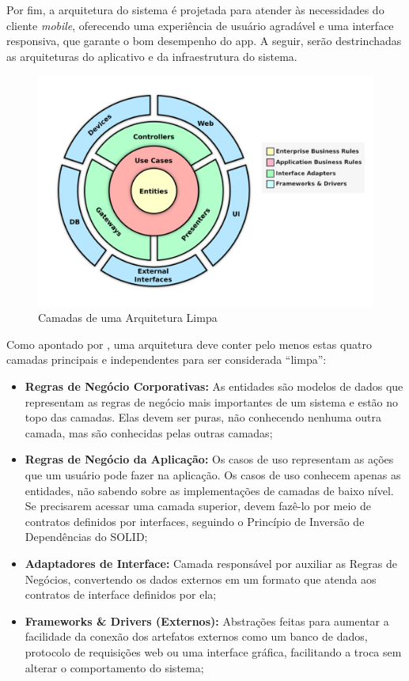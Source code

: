 Por fim, a arquitetura do sistema é projetada para atender às necessidades do cliente \textit{mobile}, oferecendo uma experiência de usuário agradável e uma interface responsiva, que garante o bom desempenho do \ac{app}. A seguir, serão destrinchadas as arquiteturas do aplicativo e da infraestrutura do sistema.

\begin{figure}[H]
\centering
  \includegraphics[width=0.9\columnwidth]{images/clean_dart.png}
  \caption{Camadas de uma Arquitetura Limpa}
  \label{fig:clean_dart}
\end{figure}

Como apontado por \cite{martin2018arquitetura}, uma arquitetura deve conter pelo menos estas quatro camadas principais e independentes para ser considerada “limpa”:
\begin{itemize}
   \item \textbf{Regras de Negócio Corporativas:} As entidades são modelos de dados que representam as regras de negócio mais importantes de um sistema e estão no topo das camadas. Elas devem ser puras, não conhecendo nenhuma outra camada, mas são conhecidas pelas outras camadas;
   \item \textbf{Regras de Negócio da Aplicação:} Os casos de uso representam as ações que um usuário pode fazer na aplicação. Os casos de uso conhecem apenas as entidades, não sabendo sobre as implementações de camadas de baixo nível. Se precisarem acessar uma camada superior, devem fazê-lo por meio de contratos definidos por interfaces, seguindo o Princípio de Inversão de Dependências do SOLID;
   \item \textbf{Adaptadores de Interface:} Camada responsável por auxiliar as Regras de Negócios, convertendo os dados externos em um formato que atenda aos contratos de interface definidos por ela;
   \item \textbf{Frameworks \& Drivers (Externos):} Abstrações feitas para aumentar a facilidade da conexão dos artefatos externos como um banco de dados, protocolo de requisições web ou uma interface gráfica, facilitando a troca sem alterar o comportamento do sistema;
 \end{itemize}

